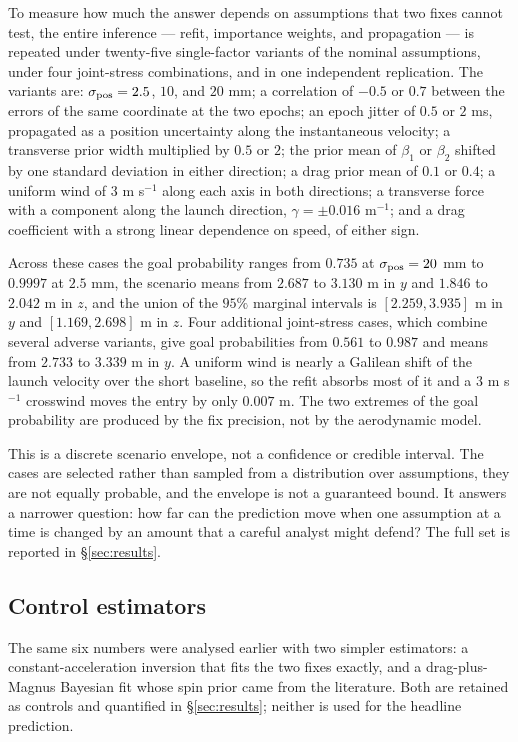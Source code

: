 To measure how much the answer depends on assumptions that two fixes cannot
test, the entire inference --- refit, importance weights, and propagation --- is
repeated under twenty-five single-factor variants of the nominal assumptions,
under four joint-stress combinations, and in one independent replication. The variants are:
$\sigma_{\rm pos}=2.5$, $10$, and $20$ mm; a correlation of $-0.5$ or $0.7$
between the errors of the same coordinate at the two epochs; an epoch jitter of
$0.5$ or $2$ ms, propagated as a position uncertainty along the instantaneous
velocity; a transverse prior width multiplied by $0.5$ or $2$; the prior mean of
$\beta_1$ or $\beta_2$ shifted by one standard deviation in either direction; a
drag prior mean of $0.1$ or $0.4$; a uniform wind of $3$ m s$^{-1}$ along each
axis in both directions; a transverse force with a component along the launch
direction, $\gamma=\pm0.016$ m$^{-1}$; and a drag coefficient with a strong
linear dependence on speed, of either sign.

Across these cases the goal probability ranges from $0.735$ at
$\sigma_{\rm pos}=20$ mm to $0.9997$ at $2.5$ mm, the scenario means from
$2.687$ to $3.130$ m in $y$ and $1.846$ to $2.042$ m in $z$, and the union of
the $95\%$ marginal intervals is $[2.259,3.935]$ m in $y$ and $[1.169,2.698]$ m
in $z$. Four additional joint-stress cases, which combine several adverse
variants, give goal probabilities from $0.561$ to $0.987$ and means from
$2.733$ to $3.339$ m in $y$. A uniform wind is nearly a Galilean
shift of the launch velocity over the short baseline, so the
refit absorbs most of it and a $3$ m s$^{-1}$ crosswind moves the entry by only
$0.007$ m. The two extremes of the goal probability are produced by the fix
precision, not by the aerodynamic model.

This is a discrete scenario envelope, not a confidence or credible interval. The
cases are selected rather than sampled from a distribution over assumptions,
they are not equally probable, and the envelope is not a guaranteed bound. It
answers a narrower question: how far can the prediction move when one assumption
at a time is changed by an amount that a careful analyst might defend? The full
set is reported in \S\ref{sec:results}.

\subsection{Control estimators}

The same six numbers were analysed earlier with two simpler estimators: a
constant-acceleration inversion that fits the two fixes exactly, and a
drag-plus-Magnus Bayesian fit whose spin prior came from the literature. Both
are retained as controls and quantified in \S\ref{sec:results}; neither is used
for the headline prediction.

